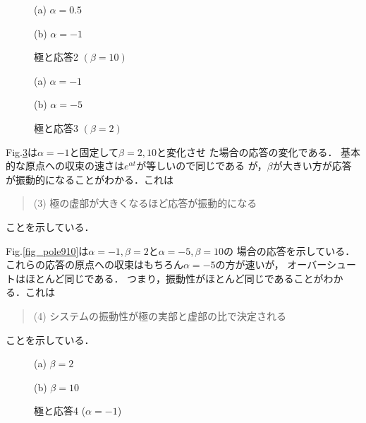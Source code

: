 \begin{figure}[t!]
 \begin{minipage}{0.5\textwidth}
  \begin{center}
   (a) $\alpha = 0.5$
  \end{center}
 \end{minipage}%
 \begin{minipage}{0.5\textwidth}
  \begin{center}
   (b) $\alpha = -1$
  \end{center}
 \end{minipage}
 \caption{極と応答2 $(\beta = 10)$}
 \label{fig_pole34}
\end{figure}

\begin{figure}[t!]
 \begin{minipage}{0.5\textwidth}
  \begin{center}
   (a) $\alpha = -1$
  \end{center}
 \end{minipage}%
 \begin{minipage}{0.5\textwidth}
  \begin{center}
   (b) $\alpha = -5$
  \end{center}
 \end{minipage}
 \caption{極と応答3 $(\beta = 2)$}
 \label{fig_pole56}
\end{figure}

Fig.\ref{fig_pole78}は$\alpha = -1$と固定して$\beta = 2, 10$と変化させ
た場合の応答の変化である．
基本的な原点への収束の速さは$e^{\alpha t}$が等しいので同じである
が，$\beta$が大きい方が応答が振動的になることがわかる．これは
\begin{quote}
(3) 極の虚部が大きくなるほど応答が振動的になる
\end{quote}
ことを示している． 

Fig.\ref{fig_pole910}は$\alpha = -1, \beta = 2$と$\alpha = -5, \beta = 10$の
場合の応答を示している．
これらの応答の原点への収束はもちろん$\alpha = -5$の方が速いが，
オーバーシュートはほとんど同じである．
つまり，振動性がほとんど同じであることがわかる．これは
\begin{quote}
 (4) システムの振動性が極の実部と虚部の比で決定される 
\end{quote}
ことを示している．

\begin{figure}[t!]
 \begin{minipage}{0.5\textwidth}
  \begin{center}
   (a) $\beta = 2$
  \end{center}
 \end{minipage}%
 \begin{minipage}{0.5\textwidth}
  \begin{center}
   (b) $\beta = 10$
  \end{center}
 \end{minipage}
 \caption{極と応答4 ($\alpha = -1$)}
 \label{fig_pole78}
\end{figure}

